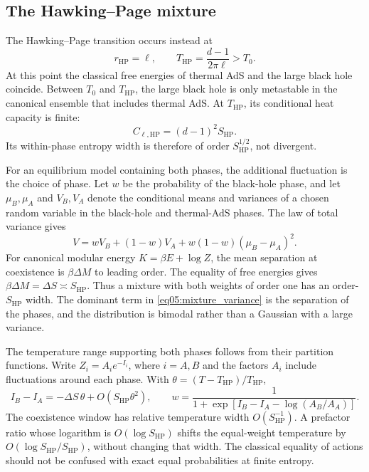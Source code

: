 \documentclass[11pt,letterpaper]{article}
\theoremstyle{plain}
\theoremstyle{definition}
\theoremstyle{remark}
\begin{document}
\subsection{The Hawking--Page mixture}

The Hawking--Page transition occurs instead at~\cite{hawkingpage1983}
\begin{equation}
 r_{\mathrm{HP}}=\ell,\qquad
 T_{\mathrm{HP}}=\frac{d-1}{2\pi\ell}>T_0.
 \label{eq05:hawking_page_temperature}
\end{equation}
At this point the classical free energies of thermal AdS and the large black hole coincide. Between $T_0$ and $T_{\mathrm{HP}}$, the large black hole is only metastable in the canonical ensemble that includes thermal AdS. At $T_{\mathrm{HP}}$, its conditional heat capacity is finite:
\begin{equation}
 C_{\ell,\mathrm{HP}}=(d-1)^2 S_{\mathrm{HP}}.
 \label{eq05:hp_capacity}
\end{equation}
Its within-phase entropy width is therefore of order $S_{\mathrm{HP}}^{1/2}$, not divergent.

For an equilibrium model containing both phases, the additional fluctuation is the choice of phase. Let $w$ be the probability of the black-hole phase, and let $\mu_B,\mu_A$ and $V_B,V_A$ denote the conditional means and variances of a chosen random variable in the black-hole and thermal-AdS phases. The law of total variance gives
\begin{equation}
 V=wV_B+(1-w)V_A+w(1-w)(\mu_B-\mu_A)^2.
 \label{eq05:mixture_variance}
\end{equation}
For canonical modular energy $K=\beta E+\log Z$, the mean separation at coexistence is $\beta\Delta M$ to leading order. The equality of free energies gives $\beta\Delta M=\Delta S\asymp S_{\mathrm{HP}}$. Thus a mixture with both weights of order one has an order-$S_{\mathrm{HP}}$ width. The dominant term in \eqref{eq05:mixture_variance} is the separation of the phases, and the distribution is bimodal rather than a Gaussian with a large variance.

The temperature range supporting both phases follows from their partition functions. Write $Z_i=A_i e^{-I_i}$, where $i=A,B$ and the factors $A_i$ include fluctuations around each phase. With $\theta=(T-T_{\mathrm{HP}})/T_{\mathrm{HP}}$,
\begin{equation}
 I_B-I_A=-\Delta S\,\theta+O(S_{\mathrm{HP}}\theta^2),\qquad
 w=\frac{1}{1+\exp\!\left[I_B-I_A-\log(A_B/A_A)\right]}.
 \label{eq05:phase_weight}
\end{equation}
The coexistence window has relative temperature width $O(S_{\mathrm{HP}}^{-1})$. A prefactor ratio whose logarithm is $O(\log S_{\mathrm{HP}})$ shifts the equal-weight temperature by $O(\log S_{\mathrm{HP}}/S_{\mathrm{HP}})$, without changing that width. The classical equality of actions should not be confused with exact equal probabilities at finite entropy.
\end{document}
